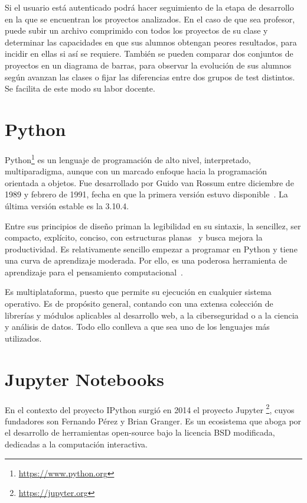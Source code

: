 \documentclass[a4paper, 12pt]{book}
\begin{document}
Si el usuario está autenticado podrá hacer seguimiento de la etapa de desarrollo en la que se encuentran los proyectos analizados. En el caso de que sea profesor, puede subir un archivo comprimido con todos los proyectos de su clase y determinar las capacidades en que sus alumnos obtengan peores resultados, para incidir en ellas si así se requiere. También se pueden comparar dos conjuntos de proyectos en un diagrama de barras, para observar la evolución de sus alumnos según avanzan las clases o fijar las diferencias entre dos grupos de test distintos. Se facilita de este modo su labor docente.

\section{Python}
\label{sec:python}
Python\footnote{\url{https://www.python.org}} es un lenguaje de programación de alto nivel, interpretado, multiparadigma, aunque con un marcado enfoque hacia la programación orientada a objetos. Fue desarrollado por Guido van Rossum entre diciembre de 1989 y febrero de 1991, fecha en que la primera versión estuvo disponible~\cite{van2007python}. La última versión estable es la 3.10.4.

Entre sus principios de diseño priman la legibilidad en su sintaxis, la sencillez, ser compacto, explícito, conciso, con estructuras planas~\cite{peters2010zen} y busca mejora la productividad. Es relativamente sencillo empezar a programar en Python y tiene una curva de aprendizaje moderada. Por ello, es una poderosa herramienta de aprendizaje para el pensamiento computacional~\cite{wang2021research}.

Es multiplataforma, puesto que permite su ejecución en cualquier sistema operativo. Es de propósito general, contando con una extensa colección de librerías y módulos aplicables al desarrollo web, a la ciberseguridad o a la ciencia y análisis de datos. Todo ello conlleva a que sea uno de los lenguajes más utilizados. 

\section{Jupyter Notebooks}
\label{sec:jupyter}

En el contexto del proyecto IPython surgió en 2014 el proyecto Jupyter \footnote{\url{https://jupyter.org}}, cuyos fundadores son Fernando Pérez y Brian Granger. Es un ecosistema que aboga por el desarrollo de herramientas open-source bajo la licencia BSD modificada, dedicadas a la computación interactiva. 
\end{document}
